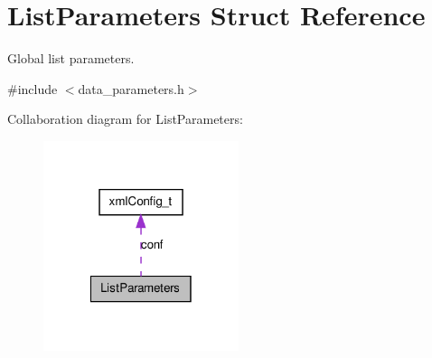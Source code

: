 \hypertarget{structListParameters}{
\section{ListParameters Struct Reference}
\label{structListParameters}
}


Global list parameters.  




{\ttfamily \#include $<$data\_\-parameters.h$>$}



Collaboration diagram for ListParameters:\nopagebreak
\begin{figure}[H]
\begin{center}
\leavevmode
\includegraphics[width=162pt]{structListParameters__coll__graph}
\end{center}
\end{figure}
